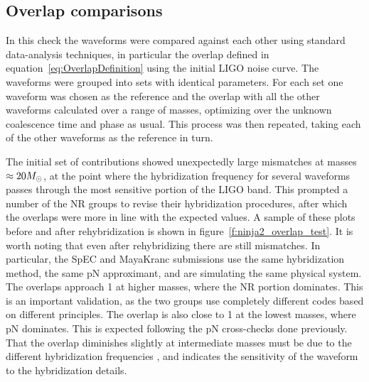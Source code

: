 \subsection{Overlap comparisons}

In this check the waveforms were compared against each other using
standard data-analysis techniques, in particular the overlap defined
in equation~\ref{eq:OverlapDefinition}  using the initial LIGO noise
curve.  The waveforms were grouped into sets with identical
parameters.  For each set one waveform was chosen as the reference and
the overlap with all the other waveforms calculated over a range of
masses, optimizing over the unknown coalescence time and phase as
usual.  This process was then repeated, taking each of the other
waveforms as the reference in turn.

The initial set of contributions showed unexpectedly large mismatches
at masses $\approx 20 M_\odot$, at the point where the hybridization
frequency for several waveforms passes through the most sensitive
portion of the LIGO band.  This prompted a number of the NR groups to
revise their hybridization procedures, after which the overlaps were
more in line with the expected values.  A sample of these plots before
and after rehybridization is shown in
figure~\ref{f:ninja2_overlap_test}.  It is worth noting that even
after rehybridizing there are still mismatches.  In particular, the
SpEC and MayaKranc submissions use the same hybridization method, the
same pN approximant, and are simulating the same physical system.  The
overlaps approach 1 at higher masses, where the NR portion dominates.
This is an important validation, as the two groups use completely
different codes based on different principles.  The overlap is also
close to 1 at the lowest masses, where pN dominates.  This is expected
following the pN cross-checks done previously.  That the overlap
diminishes slightly at intermediate masses must be due to the
different hybridization frequencies , and
indicates the sensitivity of the waveform to the hybridization
details.


